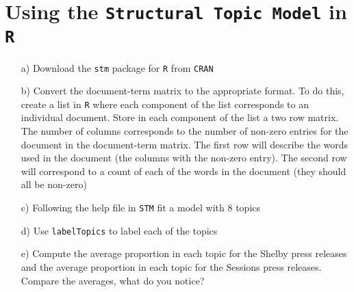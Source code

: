 \documentclass[12pt,letterpaper]{article}
\begin{document}
\section*{Using the {\tt Structural Topic Model} in {\tt R}}

\begin{itemize}
\item[a)] Download the {\tt stm} package for {\tt R} from {\tt CRAN}
\item[b)] Convert the document-term matrix to the appropriate format.  To do this, create a list in {\tt R} where each component of the list corresponds to an individual document.  Store in each component of the list a two row matrix.  The number of columns corresponds to the number of non-zero entries for the document in the document-term matrix.  The first row will describe the words used in the document (the columns with the non-zero entry).  The second row will correspond to a count of each of the words in the document (they should all be non-zero)
\item[c)] Following the help file in {\tt STM} fit a model with 8 topics
\item[d)] Use {\tt labelTopics} to label each of the topics
\item[e)] Compute the average proportion in each topic for the Shelby press releases and the average proportion in each topic for the Sessions press releases.  Compare the averages, what do you notice?  
\end{itemize}
\end{document}
